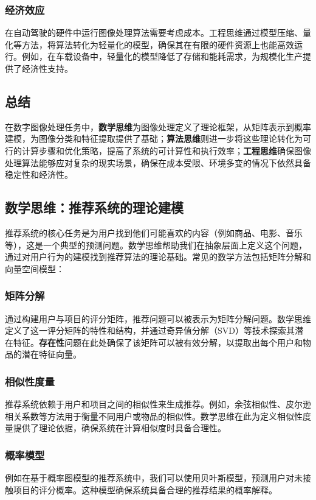 \subsubsection*{经济效应}

在自动驾驶的硬件中运行图像处理算法需要考虑成本。工程思维通过模型压缩、量化等方法，将算法转化为轻量化的模型，确保其在有限的硬件资源上也能高效运行。例如，在车载设备中，轻量化的模型降低了存储和能耗需求，为规模化生产提供了经济性支持。

\subsection{  总结}

在数字图像处理任务中，{\bf 数学思维}为图像处理定义了理论框架，从矩阵表示到概率建模，为图像分类和特征提取提供了基础；{\bf 算法思维}则进一步将这些理论转化为可行的计算步骤和优化策略，提高了系统的可计算性和执行效率；{\bf 工程思维}确保图像处理算法能够应对复杂的现实场景，确保在成本受限、环境多变的情况下依然具备稳定性和经济性。


\subsection{ 数学思维：推荐系统的理论建模}
推荐系统的核心任务是为用户找到他们可能喜欢的内容（例如商品、电影、音乐等），这是一个典型的预测问题。数学思维帮助我们在抽象层面上定义这个问题，通过对用户行为的建模找到推荐算法的理论基础。常见的数学方法包括矩阵分解和向量空间模型：

\subsubsection*{矩阵分解}
通过构建用户与项目的评分矩阵，推荐问题可以被表示为矩阵分解问题。数学思维定义了这一评分矩阵的特性和结构，并通过奇异值分解（SVD）等技术探索其潜在特征。{\bf 存在性}问题在此处确保了该矩阵可以被有效分解，以提取出每个用户和物品的潜在特征向量。
  
\subsubsection*{相似性度量}
推荐系统依赖于用户和项目之间的相似性来生成推荐。例如，余弦相似性、皮尔逊相关系数等方法用于衡量不同用户或物品的相似性。数学思维在此为定义相似性度量提供了理论依据，确保系统在计算相似度时具备合理性。

\subsubsection*{概率模型}
例如在基于概率图模型的推荐系统中，我们可以使用贝叶斯模型，预测用户对未接触项目的评分概率。这种模型确保系统具备合理的推荐结果的概率解释。


